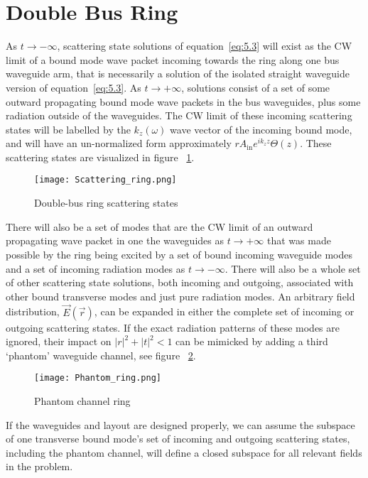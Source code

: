 \documentclass[12pt]{article}
\begin{document}
\section{Double Bus Ring}
As $t\rightarrow-\infty$, scattering state solutions of equation~\ref{eq:5.3} will exist as the CW limit of a bound mode wave packet incoming towards the ring along one bus waveguide arm, that is necessarily a solution of the isolated straight waveguide version of equation~\ref{eq:5.3}. As $t\rightarrow+\infty$, solutions consist of a set of some outward propagating bound mode wave packets in the bus waveguides, plus some radiation outside of the waveguides.
The CW limit of these incoming scattering states will be labelled by the $k_z (\omega)$ wave vector of the incoming bound mode, and will have an un-normalized form approximately $rA_{\text{in}} e^{ik_zz} \Theta(z)$. These scattering states are visualized in figure ~\ref{fig:RingScatState}. 
\begin{figure}
    \centering
    \texttt{[image: Scattering\_ring.png]}
    \caption{Double-bus ring scattering states}
    \label{fig:RingScatState}
\end{figure}
There will also be a set of modes that are the CW limit of an outward propagating wave packet in one the waveguides as $t\rightarrow+\infty$ that was made possible by the ring being excited by a set of bound incoming waveguide modes and a set of incoming radiation modes as $t\rightarrow-\infty$.
There will also be a whole set of other scattering state solutions, both incoming and outgoing, associated with other bound transverse modes and just pure radiation modes. 
An arbitrary field distribution, $\vec{E}(\vec{r})$, can be expanded in either the complete set of incoming or outgoing scattering states.
If the exact radiation patterns of these modes are ignored, their impact on $|r|^2+|t|^2<1$ can be mimicked by adding a third ‘phantom’ waveguide channel, see figure ~\ref{fig:PhantomRing}.
\begin{figure}
    \centering
    \texttt{[image: Phantom\_ring.png]}
    \caption{Phantom channel ring}
    \label{fig:PhantomRing}
\end{figure}
If the waveguides and layout are designed properly, we can assume the subspace of one transverse bound mode’s set of incoming and outgoing scattering states, including the phantom channel, will define a closed subspace for all relevant fields in the problem. 
\end{document}
